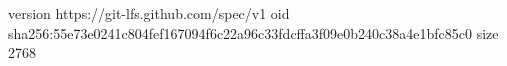 version https://git-lfs.github.com/spec/v1
oid sha256:55e73e0241c804fef167094f6c22a96c33fdcffa3f09e0b240c38a4e1bfc85c0
size 2768
